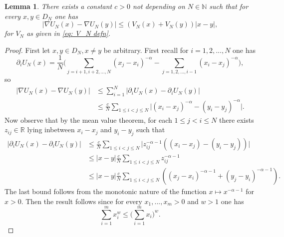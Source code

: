\documentclass[10pt,a4paper]{amsart}
\newtheorem{lemma}{Lemma}
\begin{document}
\begin{lemma}\label{lem: Lyapunov lipschitz}
    There exists a constant $c>0$ not depending on $N\in \mathbb{N}$ such that for every $x,y \in D_N$ one has
   \begin{equation}
       \lvert \nabla U_N(x)-\nabla U_N(y)\rvert\leq (V_N(x)+V_N(y)) \lvert x-y\rvert,
   \end{equation}
   for $V_N$ as given in \eqref{eq: V_N defn}.
\end{lemma}

\begin{proof}
     First let $x,y \in D_N, x\not=y$ be arbitrary. First recall for $i=1,2,...,N$ one has
     \begin{equation}
\partial_i U_N(x)=\frac{1}{N}\biggr (\sum_{j=i+1,i+2,...,N}( x_j-x_i)^{-\alpha}-\sum_{j=1,2,...,i-1}( x_i-x_j)^{-\alpha}\biggr),
     \end{equation}
so
\begin{align}
    \lvert \nabla U_N(x)-\nabla U_N(y)\rvert&\leq \sum_{i=1}^N\lvert  \partial_i U_N(x)-\partial_i U_N(y) \rvert\nonumber \\
    &\leq \frac{c}{N}\sum_{1\leq i<j\leq N}\lvert (x_i-x_j)^{-\alpha}-(y_i-y_j)^{-\alpha}\rvert.
\end{align}
 Now observe that by the mean value theorem, for each $1\leq j<i\leq N$ there exists $z_{ij}\in \mathbb{R}$ lying inbetween $x_i-x_j$ and $y_i-y_j$ such that
 \begin{align}
 \lvert  \partial_i U_N(x)-\partial_i U_N(y) \rvert &\leq \frac{c}{N}\sum_{1\leq i<j\leq N}\lvert z_{ij}^{-\alpha-1}((x_i-x_j)-(y_i-y_j))\rvert\nonumber \\
  &\leq \lvert x-y\rvert\frac{c}{N}\sum_{1\leq i<j\leq N} z_{ij}^{-\alpha-1}\nonumber \\
  &\leq \lvert x-y\rvert\frac{c}{N}\sum_{1\leq i<j\leq N} ( ( x_j-x_i)^{-\alpha-1}+( y_j-y_i)^{-\alpha-1}).
 \end{align}
 The last bound follows from the monotonic nature of the function $x\mapsto x^{-\alpha-1}$ for $x>0$. Then the result follows since for every $x_1,...,x_m>0$ and $w>1$ one has
 \begin{equation}\label{eq: power expression}
  \sum_{i=1}^mx_i^w \leq  \biggr ( \sum_{i=1}^mx_i \biggr)^w .
 \end{equation}
\end{proof}
\end{document}
